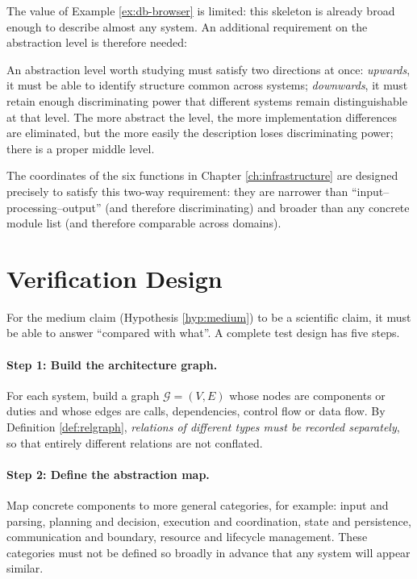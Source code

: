 The value of Example \ref{ex:db-browser} is limited: this skeleton is already broad enough
to describe almost any system. An additional requirement on the abstraction level is
therefore needed:

\begin{principle}\label{pr:abstraction-level}
An abstraction level worth studying must satisfy two directions at once: \emph{upwards}, it
must be able to identify structure common across systems; \emph{downwards}, it must retain
enough discriminating power that different systems remain distinguishable at that level.
The more abstract the level, the more implementation differences are eliminated, but the
more easily the description loses discriminating power; there is a proper middle level.
\end{principle}

The coordinates of the six functions in Chapter \ref{ch:infrastructure} are designed
precisely to satisfy this two-way requirement: they are narrower than
``input--processing--output'' (and therefore discriminating) and broader than any concrete
module list (and therefore comparable across domains).

\section{Verification Design}\label{sec:baseline}

For the medium claim (Hypothesis \ref{hyp:medium}) to be a scientific claim, it must be able
to answer ``compared with what''. A complete test design has five steps.

\paragraph{Step 1: Build the architecture graph.}
For each system, build a graph $\mathcal{G} = (V, E)$ whose nodes are components or duties
and whose edges are calls, dependencies, control flow or data flow. By
Definition \ref{def:relgraph}, \emph{relations of different types must be recorded
separately}, so that entirely different relations are not conflated.

\paragraph{Step 2: Define the abstraction map.}
Map concrete components to more general categories, for example: input and parsing, planning
and decision, execution and coordination, state and persistence, communication and
boundary, resource and lifecycle management. These categories must not be defined so broadly
in advance that any system will appear similar.

